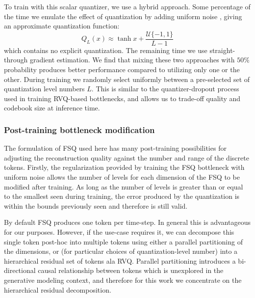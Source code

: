 \documentclass{article} %
\begin{document}
To train with this scalar quantizer, we use a hybrid approach. Some percentage of the time we emulate the effect of quantization by adding uniform noise \citep{brendel2024}, giving an approximate quantization function:
\begin{equation}
Q_L(x) \approx \tanh{x} + \frac{\mathcal{U}\{-1,1\}}{L-1}
\end{equation}
which contains no explicit quantization. The remaining time we use straight-through gradient estimation. We find that mixing these two approaches with $50\%$ probability produces better performance compared to utilizing only one or the other. During training we randomly select uniformly between a pre-selected set of quantization level numbers $L$. This is similar to the quantizer-dropout process used in training RVQ-based bottlenecks, and allows us to trade-off quality and codebook size at inference time.



\subsubsection{Post-training bottleneck modification}
\label{sec:post-hoc}
The formulation of FSQ used here has many post-training possibilities for adjusting the reconstruction quality against the number and range of the discrete tokens. Firstly, the regularization provided by training the FSQ bottleneck with uniform noise allows the number of levels for each dimension of the FSQ to be modified after training. As long as the number of levels is greater than or equal to the smallest seen during training, the error produced by the quantization is within the bounds previously seen and therefore is still valid.

By default FSQ produces one token per time-step. In general this is advantageous for our purposes. However, if the use-case requires it, we can decompose this single token post-hoc into multiple tokens using either a parallel partitioning of the dimensions, or (for particular choices of quantization-level number) into a hierarchical residual set of tokens ala RVQ. Parallel partitioning introduces a bi-directional causal relationship between tokens which is unexplored in the generative modeling context, and therefore for this work we concentrate on the hierarchical residual decomposition.
\end{document}
